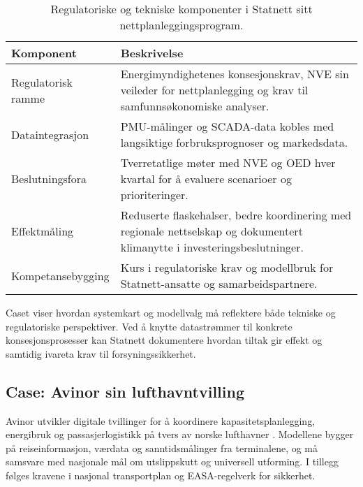 \begin{table}[ht]
    \centering
    \caption{Regulatoriske og tekniske komponenter i Statnett sitt nettplanleggingsprogram.}
    \label{tab:kap02-statnett}
    \begin{tabular}{p{}p{}}
        \toprule
        \textbf{Komponent} & \textbf{Beskrivelse} \\
        \midrule
        Regulatorisk ramme & Energimyndighetenes konsesjonskrav, NVE sin veileder for nettplanlegging og krav til samfunnsøkonomiske analyser. \\
        Dataintegrasjon & PMU-målinger og SCADA-data kobles med langsiktige forbruksprognoser og markedsdata. \\
        Beslutningsfora & Tverretatlige møter med NVE og OED hver kvartal for å evaluere scenarioer og prioriteringer. \\
        Effektmåling & Reduserte flaskehalser, bedre koordinering med regionale nettselskap og dokumentert klimanytte i investeringsbeslutninger. \\
        Kompetansebygging & Kurs i regulatoriske krav og modellbruk for Statnett-ansatte og samarbeidspartnere. \\
        \bottomrule
    \end{tabular}
\end{table}

Caset viser hvordan systemkart og modellvalg må reflektere både tekniske og regulatoriske perspektiver. Ved å knytte datastrømmer til konkrete konsesjonsprosesser kan Statnett dokumentere hvordan tiltak gir effekt og samtidig ivareta krav til forsyningssikkerhet.

\subsection{Case: Avinor sin lufthavntvilling}
Avinor utvikler digitale tvillinger for å koordinere kapasitetsplanlegging, energibruk og passasjerlogistikk på tvers av norske lufthavner \citep{avinor2022digital}. Modellene bygger på reiseinformasjon, værdata og sanntidsmålinger fra terminalene, og må samsvare med nasjonale mål om utslippskutt og universell utforming. I tillegg følges kravene i nasjonal transportplan og EASA-regelverk for sikkerhet.

